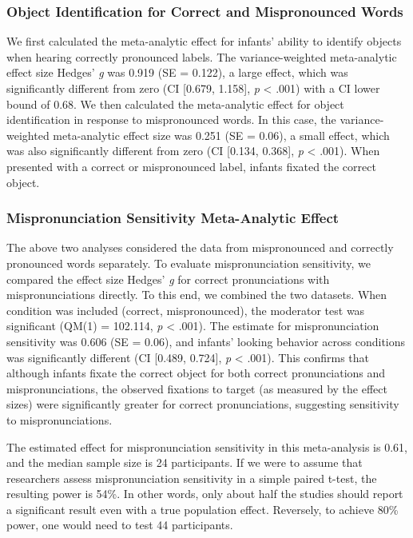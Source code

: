 \documentclass[
  man, noextraspace]{apa6}
\begin{document}
\hypertarget{object-identification-for-correct-and-mispronounced-words}{%
\subsubsection{Object Identification for Correct and Mispronounced Words}\label{object-identification-for-correct-and-mispronounced-words}}

We first calculated the meta-analytic effect for infants' ability to identify objects when hearing correctly pronounced labels. The variance-weighted meta-analytic effect size Hedges' \emph{g} was 0.919 (SE = 0.122), a large effect, which was significantly different from zero (CI {[}0.679, 1.158{]}, \emph{p} \textless{} .001) with a CI lower bound of 0.68. We then calculated the meta-analytic effect for object identification in response to mispronounced words. In this case, the variance-weighted meta-analytic effect size was 0.251 (SE = 0.06), a small effect, which was also significantly different from zero (CI {[}0.134, 0.368{]}, \emph{p} \textless{} .001). When presented with a correct or mispronounced label, infants fixated the correct object.

\hypertarget{mispronunciation-sensitivity-meta-analytic-effect}{%
\subsubsection{Mispronunciation Sensitivity Meta-Analytic Effect}\label{mispronunciation-sensitivity-meta-analytic-effect}}

The above two analyses considered the data from mispronounced and correctly pronounced words separately. To evaluate mispronunciation sensitivity, we compared the effect size Hedges' \emph{g} for correct pronunciations with mispronunciations directly. To this end, we combined the two datasets. When condition was included (correct, mispronounced), the moderator test was significant (QM(1) = 102.114, \emph{p} \textless{} .001). The estimate for mispronunciation sensitivity was 0.606 (SE = 0.06), and infants' looking behavior across conditions was significantly different (CI {[}0.489, 0.724{]}, \emph{p} \textless{} .001). This confirms that although infants fixate the correct object for both correct pronunciations and mispronunciations, the observed fixations to target (as measured by the effect sizes) were significantly greater for correct pronunciations, suggesting sensitivity to mispronunciations.

The estimated effect for mispronunciation sensitivity in this meta-analysis is 0.61, and the median sample size is 24 participants. If we were to assume that researchers assess mispronunciation sensitivity in a simple paired t-test, the resulting power is 54\%. In other words, only about half the studies should report a significant result even with a true population effect. Reversely, to achieve 80\% power, one would need to test 44 participants.
\end{document}
